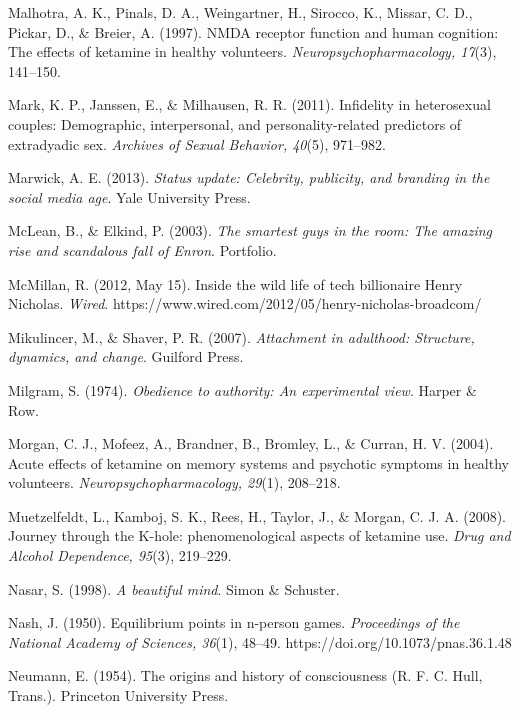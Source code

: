 \begin{thebibliography}{}
    Malhotra, A. K., Pinals, D. A., Weingartner, H., Sirocco, K., Missar, C. D., Pickar, D., \& Breier, A. (1997). NMDA receptor function and human cognition: The effects of ketamine in healthy volunteers. \textit{Neuropsychopharmacology, 17}(3), 141–150.

    Mark, K. P., Janssen, E., \& Milhausen, R. R. (2011). Infidelity in heterosexual couples: Demographic, interpersonal, and personality-related predictors of extradyadic sex. \textit{Archives of Sexual Behavior, 40}(5), 971–982.

    Marwick, A. E. (2013). \textit{Status update: Celebrity, publicity, and branding in the social media age}. Yale University Press.

    McLean, B., \& Elkind, P. (2003). \textit{The smartest guys in the room: The amazing rise and scandalous fall of Enron}. Portfolio.

    McMillan, R. (2012, May 15). Inside the wild life of tech billionaire Henry Nicholas. \textit{Wired}. https://www.wired.com/2012/05/henry-nicholas-broadcom/

    Mikulincer, M., \& Shaver, P. R. (2007). \textit{Attachment in adulthood: Structure, dynamics, and change}. Guilford Press.

    Milgram, S. (1974). \textit{Obedience to authority: An experimental view}. Harper \& Row.

    Morgan, C. J., Mofeez, A., Brandner, B., Bromley, L., \& Curran, H. V. (2004). Acute effects of ketamine on memory systems and psychotic symptoms in healthy volunteers. \textit{Neuropsychopharmacology, 29}(1), 208–218.

    Muetzelfeldt, L., Kamboj, S. K., Rees, H., Taylor, J., \& Morgan, C. J. A. (2008). Journey through the K-hole: phenomenological aspects of ketamine use. \textit{Drug and Alcohol Dependence, 95}(3), 219–229.

    Nasar, S. (1998). \textit{A beautiful mind}. Simon \& Schuster.

    Nash, J. (1950). Equilibrium points in n-person games. \textit{Proceedings of the National Academy of Sciences, 36}(1), 48–49. https://doi.org/10.1073/pnas.36.1.48

    Neumann, E. (1954). The origins and history of consciousness (R. F. C. Hull, Trans.). Princeton University Press.


\end{thebibliography}
